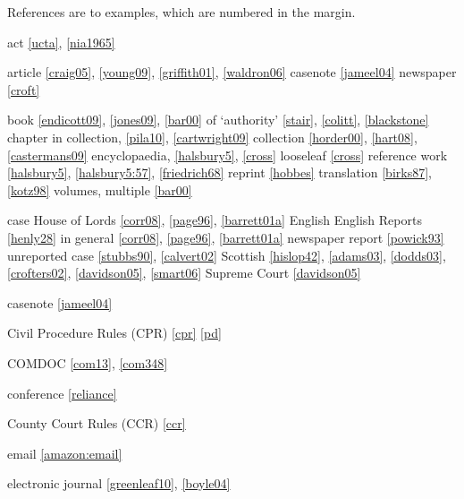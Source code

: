 \documentclass[a4paper,
               11pt,
	       DIV=1,			   
	       footinclude=false]
	      {scrartcl}
\begin{document}
\clearpage

{\def\indexname{Table of Examples}

\begin{theindex}

References are to examples, which are numbered in the margin.
\bigskip
\item act \ref{ucta}, \ref{nia1965}
\item article \ref{craig05}, \ref{young09}, \ref{griffith01}, \ref{waldron06}
\subitem casenote \ref{jameel04}
\subitem newspaper \ref{croft}
\item book \ref{endicott09}, \ref{jones09}, \ref{bar00}
  \subitem of `authority' \ref{stair}, \ref{colitt}, \ref{blackstone}
  \subitem chapter in collection, \ref{pila10}, \ref{cartwright09}
  \subitem collection \ref{horder00}, \ref{hart08}, \ref{castermans09}
  \subitem encyclopaedia, \ref{halsbury5}, \ref{cross}
  \subitem looseleaf \ref{cross}
  \subitem reference work \ref{halsbury5}, \ref{halsbury5:57}, \ref{friedrich68}
  \subitem reprint \ref{hobbes}
  \subitem translation \ref{birks87}, \ref{kotz98}
  \subitem volumes, multiple \ref{bar00}

\item case
 \subitem House of Lords \ref{corr08}, \ref{page96}, \ref{barrett01a}
 \subitem English
   \subsubitem English Reports \ref{henly28}
   \subsubitem in general \ref{corr08}, \ref{page96}, \ref{barrett01a}
   \subsubitem newspaper report \ref{powick93}
   \subsubitem unreported case \ref{stubbs90}, \ref{calvert02}
 \subitem Scottish \ref{hislop42}, \ref{adams03}, \ref{dodds03},
    \ref{crofters02}, \ref{davidson05}, \ref{smart06}
 \subitem Supreme Court \ref{davidson05}

\item{casenote} \ref{jameel04}

\item Civil Procedure Rules (CPR) \ref{cpr} \ref{pd}

\item COMDOC \ref{com13}, \ref{com348}

\item conference \ref{reliance}

\item County Court Rules (CCR) \ref{ccr}

\item email \ref{amazon:email}

\item electronic journal \ref{greenleaf10}, \ref{boyle04}


\end{theindex}}
\end{document}
